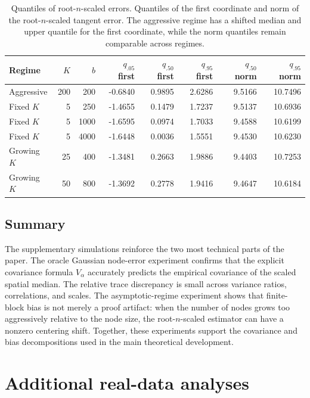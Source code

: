 \documentclass[11pt]{article}
\begin{document}
\begin{table}[ht]
\centering
\caption{
Quantiles of root-\(n\)-scaled errors.
Quantiles of the first coordinate and norm of the root-\(n\)-scaled tangent error.  The aggressive regime has a shifted median and upper quantile for the first coordinate, while the norm quantiles remain comparable across regimes.
}
\label{tab:supp-s2-quantiles}
\begin{tabular}{lrrrrrrr}
\toprule
Regime & \(K\) & \(b\) & \(q_{.05}\) first & \(q_{.50}\) first & \(q_{.95}\) first & \(q_{.50}\) norm & \(q_{.95}\) norm \\
\midrule
Aggressive & 200 & 200 & -0.6840 & 0.9895 & 2.6286 & 9.5166 & 10.7496 \\
Fixed \(K\) & 5 & 250 & -1.4655 & 0.1479 & 1.7237 & 9.5137 & 10.6936 \\
Fixed \(K\) & 5 & 1000 & -1.6595 & 0.0974 & 1.7033 & 9.4588 & 10.6199 \\
Fixed \(K\) & 5 & 4000 & -1.6448 & 0.0036 & 1.5551 & 9.4530 & 10.6230 \\
Growing \(K\) & 25 & 400 & -1.3481 & 0.2663 & 1.9886 & 9.4403 & 10.7253 \\
Growing \(K\) & 50 & 800 & -1.3692 & 0.2778 & 1.9416 & 9.4647 & 10.6184 \\
\bottomrule
\end{tabular}
\end{table}



\subsection{Summary}

The supplementary simulations reinforce the two most technical parts of the paper.  The oracle Gaussian node-error experiment confirms that the explicit covariance formula \(V_\alpha\) accurately predicts the empirical covariance of the scaled spatial median.  The relative trace discrepancy is small across variance ratios, correlations, and scales.  The asymptotic-regime experiment shows that finite-block bias is not merely a proof artifact: when the number of nodes grows too aggressively relative to the node size, the root-\(n\)-scaled estimator can have a nonzero centering shift.  Together, these experiments support the covariance and bias decompositions used in the main theoretical development.

\section{Additional real-data analyses}
\label{sec:supp-real-data}
\end{document}
